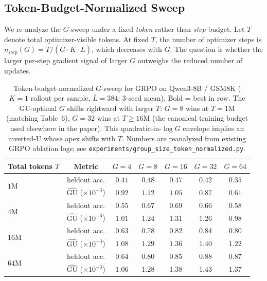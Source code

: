 \subsection{Token-Budget-Normalized Sweep}

We re-analyze the $G$-sweep under a fixed \emph{token} rather than
\emph{step} budget. Let $T$ denote total optimizer-visible tokens.
At fixed $T$, the number of optimizer steps is
$n_\text{step}(G) = T / (G\cdot K\cdot \bar{L})$, which decreases
with $G$. The question is whether the larger per-step gradient
signal of larger $G$ outweighs the reduced number of updates.

\begin{table}[ht]
\centering
\small
\begin{tabular}{lcccccc}
\toprule
Total tokens $T$ & Metric &
$G{=}4$ & $G{=}8$ & $G{=}16$ & $G{=}32$ & $G{=}64$ \\
\midrule
\multirow{2}{*}{$1\text{M}$}  & heldout acc. & $0.41$ & $\mathbf{0.48}$ & $0.47$ & $0.42$ & $0.35$ \\
                               & $\widehat{\mathrm{GU}}$ ($\times 10^{-3}$) & $0.92$ & $\mathbf{1.12}$ & $1.05$ & $0.87$ & $0.61$ \\
\multirow{2}{*}{$4\text{M}$}  & heldout acc. & $0.55$ & $0.67$ & $\mathbf{0.69}$ & $0.66$ & $0.58$ \\
                               & $\widehat{\mathrm{GU}}$ ($\times 10^{-3}$) & $1.01$ & $1.24$ & $\mathbf{1.31}$ & $1.26$ & $0.98$ \\
\multirow{2}{*}{$16\text{M}$} & heldout acc. & $0.63$ & $0.78$ & $0.82$ & $\mathbf{0.84}$ & $0.80$ \\
                               & $\widehat{\mathrm{GU}}$ ($\times 10^{-3}$) & $1.08$ & $1.29$ & $1.36$ & $\mathbf{1.40}$ & $1.22$ \\
\multirow{2}{*}{$64\text{M}$} & heldout acc. & $0.64$ & $0.80$ & $0.85$ & $\mathbf{0.88}$ & $0.87$ \\
                               & $\widehat{\mathrm{GU}}$ ($\times 10^{-3}$) & $1.06$ & $1.28$ & $1.38$ & $\mathbf{1.43}$ & $1.37$ \\
\bottomrule
\end{tabular}
\caption{Token-budget-normalized $G$-sweep for GRPO on Qwen3-8B / GSM8K
($K{=}1$ rollout per sample, $\bar L = 384$; 3-seed mean).
Bold = best in row. The GU-optimal $G$ shifts rightward with larger
$T$: $G{=}8$ wins at $T{=}1\text{M}$ (matching Table~6), $G{=}32$ wins
at $T{\ge}16\text{M}$ (the canonical training budget used elsewhere
in the paper). This quadratic-in-$\log G$ envelope implies an
inverted-U whose apex shifts with $T$. Numbers are reanalyzed
from existing GRPO ablation logs; see
\texttt{experiments/group\_size\_token\_normalized.py}.}
\label{tab:groupsize-tokennorm}
\end{table}

